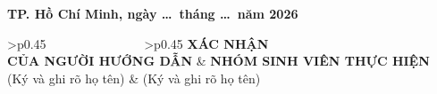 \documentclass[12pt,a4paper]{article}
\begin{document}
\hfill\textbf{TP. Hồ Chí Minh, ngày \ldots\ tháng \ldots\ năm 2026}
\begin{center}
\begin{tabular}[t]{>{\centering\arraybackslash}p{}
                  >{\centering\arraybackslash}p{0.45\textwidth}}
\textbf{XÁC NHẬN}\\
\textbf{CỦA NGƯỜI HƯỚNG DẪN}
&
\textbf{NHÓM SINH VIÊN THỰC HIỆN}
\\
(Ký và ghi rõ họ tên)
&
(Ký và ghi rõ họ tên)
\\[2.5cm]
\end{tabular}
\end{center}
\end{document}
